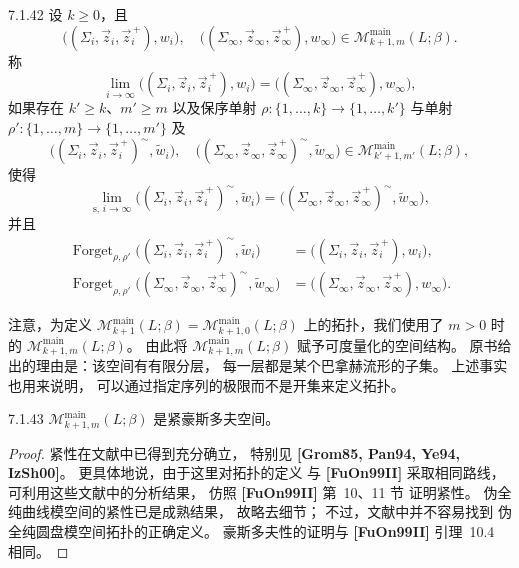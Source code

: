 \begin{definition}{7.1.42}\label{def:7-1-42}
设 $k\ge0$，且
\[
\bigl((\Sigma_i,\vec z_i,\vec z_i^{\, +}),w_i\bigr),\quad
\bigl((\Sigma_\infty,\vec z_\infty,\vec z_\infty^{\, +}),w_\infty\bigr)
\in\mathcal M^{\mathrm{main}}_{k+1,m}(L;\beta).
\]
称
\[
\lim_{i\to\infty}
\bigl((\Sigma_i,\vec z_i,\vec z_i^{\, +}),w_i\bigr)
=
\bigl((\Sigma_\infty,\vec z_\infty,\vec z_\infty^{\, +}),w_\infty\bigr),
\]
如果存在 $k'\ge k$、$m'\ge m$
以及保序单射
$\rho\colon\{1,\ldots,k\}\to\{1,\ldots,k'\}$
与单射
$\rho'\colon\{1,\ldots,m\}\to\{1,\ldots,m'\}$
及
\[
\bigl((\Sigma_i,\vec z_i,\vec z_i^{\, +})^\sim,\widetilde w_i\bigr),
\quad
\bigl((\Sigma_\infty,\vec z_\infty,\vec z_\infty^{\, +})^\sim,
\widetilde w_\infty\bigr)
\in\mathcal M^{\mathrm{main}}_{k'+1,m'}(L;\beta),
\]
使得
\[
\lim_{\mathrm{s},\,i\to\infty}
\bigl((\Sigma_i,\vec z_i,\vec z_i^{\, +})^\sim,\widetilde w_i\bigr)
=
\bigl((\Sigma_\infty,\vec z_\infty,\vec z_\infty^{\, +})^\sim,
\widetilde w_\infty\bigr),
\]
并且
\[
\begin{aligned}
\operatorname{Forget}_{\rho,\rho'}
\bigl((\Sigma_i,\vec z_i,\vec z_i^{\, +})^\sim,\widetilde w_i\bigr)
&=\bigl((\Sigma_i,\vec z_i,\vec z_i^{\, +}),w_i\bigr),\\
\operatorname{Forget}_{\rho,\rho'}
\bigl((\Sigma_\infty,\vec z_\infty,\vec z_\infty^{\, +})^\sim,
\widetilde w_\infty\bigr)
&=\bigl((\Sigma_\infty,\vec z_\infty,\vec z_\infty^{\, +}),w_\infty\bigr).
\end{aligned}
\]
\end{definition}

注意，为定义
$\mathcal M^{\mathrm{main}}_{k+1}(L;\beta)
=\mathcal M^{\mathrm{main}}_{k+1,0}(L;\beta)$
上的拓扑，我们使用了 $m>0$ 时的
$\mathcal M^{\mathrm{main}}_{k+1,m}(L;\beta)$。
由此将
$\mathcal M^{\mathrm{main}}_{k+1,m}(L;\beta)$
赋予可度量化的空间结构。
原书给出的理由是：该空间有有限分层，
每一层都是某个巴拿赫流形的子集。
上述事实也用来说明，
可以通过指定序列的极限而不是开集来定义拓扑。

\begin{theorem}{7.1.43}\label{thm:7-1-43}
$\mathcal M^{\mathrm{main}}_{k+1,m}(L;\beta)$
是紧豪斯多夫空间。
\end{theorem}

\begin{proof}
紧性在文献中已得到充分确立，
特别见
\textbf{[Grom85, Pan94, Ye94, IzSh00]}。
更具体地说，由于这里对拓扑的定义
与 \textbf{[FuOn99II]} 采取相同路线，
可利用这些文献中的分析结果，
仿照 \textbf{[FuOn99II]} 第~10、11 节
证明紧性。
伪全纯曲线模空间的紧性已是成熟结果，
故略去细节；
不过，文献中并不容易找到
伪全纯圆盘模空间拓扑的正确定义。
豪斯多夫性的证明与
\textbf{[FuOn99II]} 引理~10.4 相同。
\end{proof}

